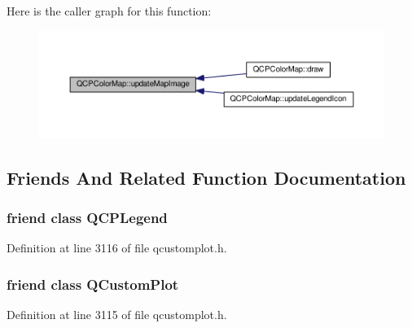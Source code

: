 Here is the caller graph for this function\+:\nopagebreak
\begin{figure}[H]
\begin{center}
\leavevmode
\includegraphics[width=350pt]{class_q_c_p_color_map_a5efcea591bb5486d968af520a4d43c3a_icgraph}
\end{center}
\end{figure}




\subsection{Friends And Related Function Documentation}
\hypertarget{class_q_c_p_color_map_a8429035e7adfbd7f05805a6530ad5e3b}{}
\subsubsection[{Q\+C\+P\+Legend}]{\setlength{\rightskip}{0pt plus 5cm}friend class {\bf Q\+C\+P\+Legend}\hspace{0.3cm}{\ttfamily [friend]}}\label{class_q_c_p_color_map_a8429035e7adfbd7f05805a6530ad5e3b}


Definition at line 3116 of file qcustomplot.\+h.

\hypertarget{class_q_c_p_color_map_a1cdf9df76adcfae45261690aa0ca2198}{}
\subsubsection[{Q\+Custom\+Plot}]{\setlength{\rightskip}{0pt plus 5cm}friend class {\bf Q\+Custom\+Plot}\hspace{0.3cm}{\ttfamily [friend]}}\label{class_q_c_p_color_map_a1cdf9df76adcfae45261690aa0ca2198}


Definition at line 3115 of file qcustomplot.\+h.




